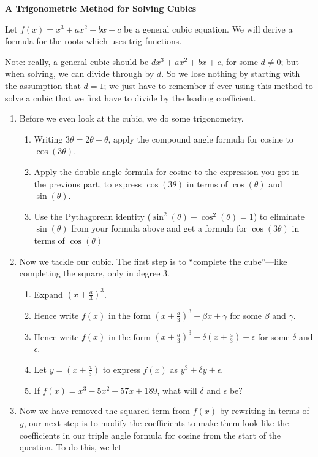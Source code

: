 \documentclass{article}
\begin{document}
\clearpage


\textbf{A Trigonometric Method for Solving Cubics}

Let $f(x)=x^3+ax^2+bx+c$ be a general cubic equation. We will derive a formula for the roots which uses trig functions.

Note: really, a general cubic should be $dx^3+ax^2+bx+c$, for some $d\neq 0$; but when solving, we can divide through by $d$. So we lose nothing by starting with the assumption that $d=1$; we just have to remember if ever using this method to solve a cubic that we first have to divide by the leading coefficient.

\begin{enumerate}
	\item Before we even look at the cubic, we do some trigonometry.
		\begin{enumerate}
			\item Writing $3\theta=2\theta+\theta$, apply the compound angle formula for cosine to $\cos(3\theta)$.
			\item Apply the double angle formula for cosine to the expression you got in the previous part, to express $\cos(3\theta)$ in terms of $\cos(\theta)$ and $\sin(\theta)$.
			\item Use the Pythagorean identity ($\sin^2(\theta)+\cos^2(\theta)=1$) to eliminate $\sin(\theta)$ from your formula above and get a formula for $\cos(3\theta)$ in terms of $\cos(\theta)$
		\end{enumerate}
	\item Now we tackle our cubic. The first step is to ``complete the cube''---like completing the square, only in degree 3.
		\begin{enumerate}
			\item Expand $\left(x+\frac{a}{3}\right)^3$.
			\item Hence write $f(x)$ in the form $\left(x+\frac{a}{3}\right)^3+\beta x + \gamma$ for some $\beta$ and $\gamma$.
			\item Hence write $f(x)$ in the form $\left(x+\frac{a}{3}\right)^3+\delta\left(x+\frac{a}{3}\right)+\epsilon$ for some $\delta$ and $\epsilon$.
			\item Let $y=\left(x+\frac{a}{3}\right)$ to express $f(x)$ as $y^3+\delta y+\epsilon$.
			\item If $f(x)=x^3-5x^2-57x+189$, what will $\delta$ and $\epsilon$ be?
		\end{enumerate}
	\item Now we have removed the squared term from $f(x)$ by rewriting in terms of $y$, our next step is to modify the coefficients to make them look like the coefficients in our triple angle formula for cosine from the start of the question. To do this, we let

\end{enumerate}
\end{document}
